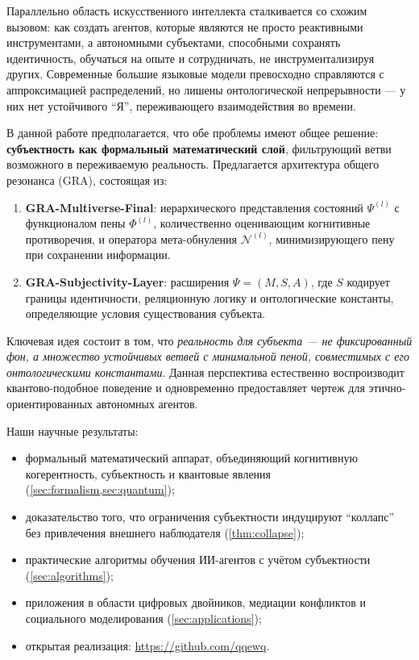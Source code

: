 \documentclass[11pt,a4paper]{article}
\theoremstyle{plain}
\theoremstyle{definition}
\theoremstyle{remark}
\newcommand{\Foam}{\Phi}
\newcommand{\NullOp}{\mathcal{N}}
\newcommand{\Mmodel}{M}
\newcommand{\Ssubj}{S}
\newcommand{\Aactive}{A}
\begin{document}
Параллельно область искусственного интеллекта сталкивается со схожим вызовом: как создать агентов, которые являются не просто реактивными инструментами, а автономными субъектами, способными сохранять идентичность, обучаться на опыте и сотрудничать, не инструментализируя других. Современные большие языковые модели превосходно справляются с аппроксимацией распределений, но лишены онтологической непрерывности --- у них нет устойчивого ``Я'', переживающего взаимодействия во времени.

В данной работе предполагается, что обе проблемы имеют общее решение: \textbf{субъектность как формальный математический слой}, фильтрующий ветви возможного в переживаемую реальность. Предлагается архитектура общего резонанса (GRA), состоящая из:

\begin{enumerate}[label=(\roman*)]
    \item \textbf{GRA-Multiverse-Final}: иерархического представления состояний $\Psi^{(l)}$ с функционалом пены $\Foam^{(l)}$, количественно оценивающим когнитивные противоречия, и оператора мета-обнуления $\NullOp^{(l)}$, минимизирующего пену при сохранении информации.
    
    \item \textbf{GRA-Subjectivity-Layer}: расширения $\Psi = (\Mmodel, \Ssubj, \Aactive)$, где $\Ssubj$ кодирует границы идентичности, реляционную логику и онтологические константы, определяющие условия существования субъекта.
\end{enumerate}

Ключевая идея состоит в том, что \textit{реальность для субъекта --- не фиксированный фон, а множество устойчивых ветвей с минимальной пеной, совместимых с его онтологическими константами}. Данная перспектива естественно воспроизводит квантово-подобное поведение и одновременно предоставляет чертеж для этично-ориентированных автономных агентов.

Наши научные результаты:
\begin{itemize}
    \item формальный математический аппарат, объединяющий когнитивную когерентность, субъектность и квантовые явления (\cref{sec:formalism,sec:quantum});
    \item доказательство того, что ограничения субъектности индуцируют ``коллапс'' без привлечения внешнего наблюдателя (\cref{thm:collapse});
    \item практические алгоритмы обучения ИИ-агентов с учётом субъектности (\cref{sec:algorithms});
    \item приложения в области цифровых двойников, медиации конфликтов и социального моделирования (\cref{sec:applications});
    \item открытая реализация: \url{https://github.com/qqewq}.
\end{itemize}
\end{document}
